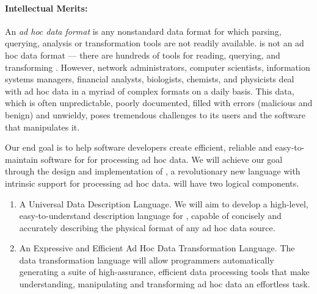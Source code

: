 
\paragraph*{Intellectual Merits:} 
An {\em ad hoc data format} is any nonstandard data format for which
parsing, querying, analysis or transformation tools are not readily
available.  \xml{} is not an ad hoc data format --- there are hundreds
of tools for reading, querying, and transforming \xml{}.   However,
network administrators, computer scientists, information systems managers,
financial analysts, biologists, chemists, and physicists deal with ad hoc
data in a myriad of complex formats on a daily basis.
This data, which is often unpredictable, poorly documented,
filled with errors (malicious and benign) and unwieldy,
poses tremendous challenges to its users and the software
that manipulates it.  

Our end goal is to help software developers 
create efficient, reliable and easy-to-maintain software for
for processing ad hoc data.  We will achieve our goal
through the design and implementation of \datatype,
a revolutionary new language with intrinsic support for 
processing ad hoc data.  \datatype{} will have 
two logical components.

\begin{enumerate}
\item A Universal Data Description Language.  We will aim to develop a 
high-level, easy-to-understand description language for \datatype, capable of
concisely and accurately describing the physical format of
any ad hoc data source. 
\item An Expressive and Efficient Ad Hoc Data Transformation Language.
The data transformation language will allow programmers
automatically generating a suite of high-assurance,
efficient data processing tools that make understanding, manipulating 
and transforming ad hoc data an effortless task.
\end{enumerate}

